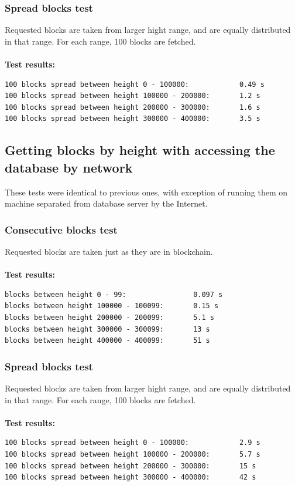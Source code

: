 \documentclass[12pt, en, eng, twoside, final]{mgr}
\begin{document}
\subsubsection{Spread blocks test}
Requested blocks are taken from larger hight range, and are equally distributed in that range. For each range, 100 blocks are fetched.
\\
\\ 
\textbf{Test results:}
\begin{verbatim}
100 blocks spread between height 0 - 100000:            0.49 s
100 blocks spread between height 100000 - 200000:       1.2 s
100 blocks spread between height 200000 - 300000:       1.6 s
100 blocks spread between height 300000 - 400000:       3.5 s
\end{verbatim}


\subsection{Getting blocks by height with accessing the database by network}
These tests were identical to previous ones, with exception of running them on machine separated from database server by the Internet.

\subsubsection{Consecutive blocks test}
Requested blocks are taken just as they are in blockchain.
\\
\\
\textbf{Test results:}
\begin{verbatim}
blocks between height 0 - 99:                0.097 s
blocks between height 100000 - 100099:       0.15 s
blocks between height 200000 - 200099:       5.1 s
blocks between height 300000 - 300099:       13 s
blocks between height 400000 - 400099:       51 s
\end{verbatim}

\subsubsection{Spread blocks test}
Requested blocks are taken from larger hight range, and are equally distributed in that range. For each range, 100 blocks are fetched.
\\
\\ 
\textbf{Test results:}
\begin{verbatim}
100 blocks spread between height 0 - 100000:            2.9 s
100 blocks spread between height 100000 - 200000:       5.7 s
100 blocks spread between height 200000 - 300000:       15 s
100 blocks spread between height 300000 - 400000:       42 s
\end{verbatim}
\end{document}
